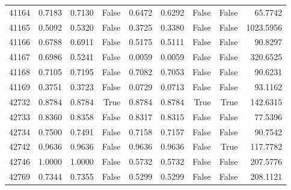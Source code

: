 \begin{longtable}{rrrrrrrrr}
41164 & 0.7183 & 0.7130 & False & 0.6472 & 0.6292 & False & False & 65.7742 \\
41165 & 0.5092 & 0.5320 & False & 0.3725 & 0.3380 & False & False & 1023.5956 \\
41166 & 0.6788 & 0.6911 & False & 0.5175 & 0.5111 & False & False & 90.8297 \\
41167 & 0.6986 & 0.5241 & False & 0.0059 & 0.0059 & False & False & 320.6525 \\
41168 & 0.7105 & 0.7195 & False & 0.7082 & 0.7053 & False & False & 90.6231 \\
41169 & 0.3751 & 0.3723 & False & 0.0729 & 0.0713 & False & False & 93.1162 \\
42732 & 0.8784 & 0.8784 & True & 0.8784 & 0.8784 & True & True & 142.6315 \\
42733 & 0.8360 & 0.8358 & False & 0.8317 & 0.8315 & False & False & 77.5396 \\
42734 & 0.7500 & 0.7491 & False & 0.7158 & 0.7157 & False & False & 90.7542 \\
42742 & 0.9636 & 0.9636 & False & 0.9636 & 0.9636 & False & True & 117.7782 \\
42746 & 1.0000 & 1.0000 & False & 0.5732 & 0.5732 & False & False & 207.5776 \\
42769 & 0.7344 & 0.7355 & False & 0.5299 & 0.5299 & False & False & 208.1121 \\
\end{longtable}
